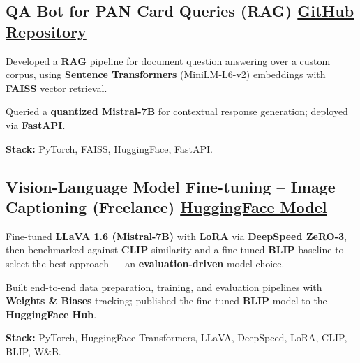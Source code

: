 \documentclass[letter,10pt]{article}
\begin{document}
\subsection{QA Bot for PAN Card Queries (RAG) \hfill \href{https://github.com/sunil448832/Natural-Language-Processing/tree/master/RAG(Retrieval\%20Augment\%20Generation)}{GitHub Repository}}
\begin{zitemize}
\item Developed a \textbf{RAG} pipeline for document question answering over a custom corpus, using \textbf{Sentence Transformers} (MiniLM-L6-v2) embeddings with \textbf{FAISS} vector retrieval.
\item Queried a \textbf{quantized Mistral-7B} for contextual response generation; deployed via \textbf{FastAPI}.
\item \textbf{Stack:} PyTorch, FAISS, HuggingFace, FastAPI.
\end{zitemize}

\subsection{Vision-Language Model Fine-tuning – Image Captioning (Freelance) \hfill \href{https://huggingface.co/sunil448832/blip-model}{HuggingFace Model}}
\begin{zitemize}
\item Fine-tuned \textbf{LLaVA 1.6 (Mistral-7B)} with \textbf{LoRA} via \textbf{DeepSpeed ZeRO-3}, then benchmarked against \textbf{CLIP} similarity and a fine-tuned \textbf{BLIP} baseline to select the best approach --- an \textbf{evaluation-driven} model choice.
\item Built end-to-end data preparation, training, and evaluation pipelines with \textbf{Weights \& Biases} tracking; published the fine-tuned \textbf{BLIP} model to the \textbf{HuggingFace Hub}.
\item \textbf{Stack:} PyTorch, HuggingFace Transformers, LLaVA, DeepSpeed, LoRA, CLIP, BLIP, W\&B.
\end{zitemize}
\end{document}

